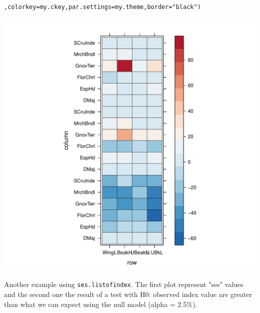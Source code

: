 \documentclass[12pt]{article}\usepackage[]{graphicx}\usepackage[]{color}
\makeatletter
\def\maxwidth{ %
  \ifdim\Gin@nat@width>\linewidth
    \linewidth
  \else
    \Gin@nat@width
  \fi
}
\newcommand{\hlstr}[1]{\textcolor[rgb]{0.192,0.494,0.8}{#1}}%
\newcommand{\hlstd}[1]{\textcolor[rgb]{0.345,0.345,0.345}{#1}}%
\newcommand{\hlkwc}[1]{\textcolor[rgb]{0.333,0.667,0.333}{#1}}%
\newenvironment{kframe}{%
 \def\at@end@of@kframe{}%
 \ifinner\ifhmode%
  \def\at@end@of@kframe{\end{minipage}}%
  \begin{minipage}{\columnwidth}%
 \fi\fi%
 \def\FrameCommand##1{\hskip\@totalleftmargin \hskip-\fboxsep
 \colorbox{shadecolor}{##1}\hskip-\fboxsep
     \hskip-\linewidth \hskip-\@totalleftmargin \hskip\columnwidth}%
 \MakeFramed {\advance\hsize-\width
   \@totalleftmargin\z@ \linewidth\hsize
   \@setminipage}}%
 {\par\unskip\endMakeFramed%
 \at@end@of@kframe}
\newenvironment{knitrout}{}{} %
\makeatother
\begin{document}
\begin{knitrout}
\begin{kframe}
\begin{alltt}
     \hlstd{,} \hlkwc{colorkey} \hlstd{= my.ckey,} \hlkwc{par.settings} \hlstd{= my.theme,}\hlkwc{border} \hlstd{=} \hlstr{"black"}\hlstd{)}
\end{alltt}
\end{kframe}
\includegraphics[width=\maxwidth]{figure/unnamed-chunk-632} 

\end{knitrout}

Another example using \texttt{ses.listofindex}. The first plot represent "ses" values and the second one the result of a test with H0: observed index value are greater than what we can expect using the null model (alpha = 2.5\%).
\end{document}
